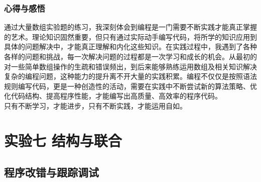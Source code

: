 \documentclass[supercite]{Experimental_Report}
\theoremstyle{definition}
\begin{document}
		\subsubsection{心得与感悟}
		通过大量数组实验题的练习，我深刻体会到编程是一门需要不断实践才能真正掌握的艺术。理论知识固然重要，但只有通过实际动手编写代码，将所学的知识应用到具体的问题解决中，才能真正理解和内化这些知识。在实践过程中，我遇到了各种各样的问题和挑战，每一次解决问题的过程都是一次学习和成长的机会。从最初的对一些简单数组操作的生疏和错误频出，到后来能够熟练运用数组及相关知识解决复杂的编程问题，这种能力的提升离不开大量的实践积累。编程不仅仅是按照语法规则编写代码，更是一种创造性的活动，需要在实践中不断尝试新的算法策略、优化代码结构、提高程序性能，才能编写出高质量、高效率的程序代码。\\
		只有不断学习，才能进步，只有不断实践，才能运用自如。
		
	\section{实验七 结构与联合}
		\subsection{程序改错与跟踪调试}
\end{document}
